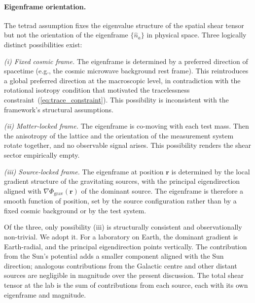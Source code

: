 \documentclass[a4paper,fleqn]{cas-dc}
\theoremstyle{thmstyleone}%
\theoremstyle{thmstyletwo}%
\begin{document}
\paragraph{Eigenframe orientation.}
\label{para:eigenframe}
The tetrad assumption fixes the eigenvalue structure of the
spatial shear tensor but not the orientation of the eigenframe
$\{\hat{n}_a\}$ in physical space. Three logically distinct
possibilities exist:

\textit{(i) Fixed cosmic frame.}
The eigenframe is determined by a preferred direction
of spacetime (e.g., the cosmic microwave background rest
frame). This reintroduces a global preferred direction at the
macroscopic level, in contradiction with the rotational
isotropy condition that motivated the tracelessness
constraint~(\ref{eq:trace_constraint}). This possibility is
inconsistent with the framework's structural assumptions.

\textit{(ii) Matter-locked frame.}
The eigenframe is co-moving with each test mass. Then the
anisotropy of the lattice and the orientation of the
measurement system rotate together, and no observable signal
arises. This possibility renders the shear sector empirically
empty.

\textit{(iii) Source-locked frame.}
The eigenframe at position $\mathbf{r}$ is determined by the
local gradient structure of the gravitating sources, with the
principal eigendirection aligned with
$\nabla\Phi_{\mathrm{grav}}(\mathbf{r})$ of the dominant
source. The eigenframe is therefore a smooth function of
position, set by the source configuration rather than by a
fixed cosmic background or by the test system.

Of the three, only possibility (iii) is structurally
consistent and observationally non-trivial. We adopt it. For
a laboratory on Earth, the dominant gradient is Earth-radial,
and the principal eigendirection points vertically. The
contribution from the Sun's potential adds a smaller component
aligned with the Sun direction; analogous contributions from
the Galactic centre and other distant sources are negligible
in magnitude over the present discussion. The total shear
tensor at the lab is the sum of contributions from each
source, each with its own eigenframe and magnitude.
\end{document}

